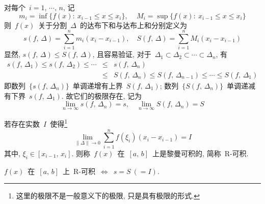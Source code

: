 \smallskip

对每个~$i = 1,\, \cdots,\, n$, 记
\[
m_i = \inf\{f(x): \: x_{i-1} \leqslant x \leqslant x_i\},  \,  \quad M_i = \sup\{f(x): \: x_{i-1} \leqslant x \leqslant x_i\}
\]
则~$f(x)$~关于分割~$\Delta$~的达布下和与达布上和分别定义为
\[
s(f,\, \Delta) = \sum_{i=1}^n m_i (x_i - x_{i-1}),  \quad S(f,\, \Delta) = \sum_{i=1}^n M_i (x_i - x_{i-1})
\]
显然, $s(f,\,\Delta) \leqslant S(f,\, \Delta)$, 且容易验证, 对于~$\Delta_1 \subset \Delta_2 \subset \cdots
\subset \Delta_n$, 有
\begin{eqnarray*}
s(f,\, \Delta_1) \leqslant s(f,\, \Delta_2) \leqslant \cdots &\leqslant& s(f,\, \Delta_n) \\
&\leqslant& S(f,\, \Delta_n) \leqslant S(f,\, \Delta_{n-1}) \leqslant \cdots \leqslant S(f,\, \Delta_1)
\end{eqnarray*}
即数列~$\big\{ s(f,\, \Delta_n) \big\}$~单调递增有上界~$S(f,\, \Delta_1)$; 数列~$\big\{ S(f,\, \Delta_n) \big\}$~单调递减有下界~$s(f,\, \Delta_1)$. 故它们的极限存在, 记为
\[
\lim\limits_{n \to \infty} s(f,\,  \Delta_n) = s,\quad \lim\limits_{n \to \infty} S(f,\,  \Delta_n) = S
\]

\begin{definition}
若存在实数~$I$~使得\footnote{这里的极限不是一般意义下的极限, 只是具有极限的形式. }
\[
\lim_{\|\Delta\| \to 0} \sum_{i=1}^n f(\xi_i) (x_i - x_{i-1}) = I
\]
其中, $\xi_i \in [x_{i-1},\, x_i]$. 则称~$f(x)$~在~$[a,\, b]$~上是黎曼可积的, 简称~R-可积.
\end{definition}

\begin{theorem} \label{thm441}
$f(x)$~在~$[a,\, b]$~上~R-可积~$\Longleftrightarrow$~$s = S ~(= I)$.
\end{theorem}

